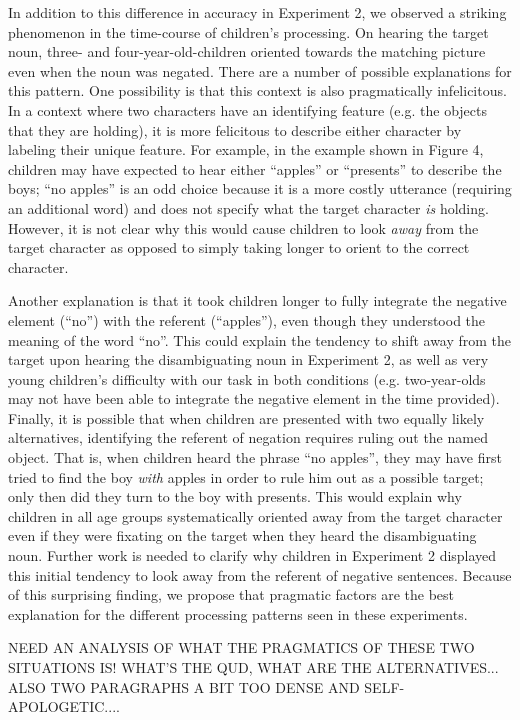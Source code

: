 \documentclass[man]{apa2}
\begin{document}
In addition to this difference in accuracy in Experiment 2, we observed a striking phenomenon in the time-course of children's processing. On hearing the target noun, three- and four-year-old-children oriented towards the matching picture even when the noun was negated.  There are a number of possible explanations for this pattern.  One possibility is that this context is also pragmatically infelicitous.  In a context where two characters have an identifying feature (e.g. the objects that they are holding), it is more felicitous to describe either character by labeling their unique feature.  For example, in the example shown in Figure 4, children may have expected to hear either ``apples'' or ``presents'' to describe the boys; ``no apples'' is an odd choice because it is a more costly utterance (requiring an additional word) and does not specify what the target character \emph{is} holding.  However, it is not clear why this would cause children to look \emph{away} from the target character as opposed to simply taking longer to orient to the correct character.  

Another explanation is that it took children longer to fully integrate the negative element (``no'') with the referent (``apples''), even though they understood the meaning of the word ``no''.  This could explain the tendency to shift away from the target upon hearing the disambiguating noun in Experiment 2, as well as very young children's difficulty with our task in both conditions (e.g. two-year-olds may not have been able to integrate the negative element in the time provided).  Finally, it is possible that when children are presented with two equally likely alternatives, identifying the referent of negation requires ruling out the named object.  That is, when children heard the phrase ``no apples'', they may have first tried to find the boy \emph{with} apples in order to rule him out as a possible target; only then did they turn to the boy with presents.  This would explain why children in all age groups systematically oriented away from the target character even if they were fixating on the target when they heard the disambiguating noun.  Further work is needed to clarify why children in Experiment 2 displayed this initial tendency to look away from the referent of negative sentences.  Because of this surprising finding, we propose that pragmatic factors are the best explanation for the different processing patterns seen in these experiments. 

NEED AN ANALYSIS OF WHAT THE PRAGMATICS OF THESE TWO SITUATIONS IS! WHAT'S THE QUD, WHAT ARE THE ALTERNATIVES... ALSO TWO PARAGRAPHS A BIT TOO DENSE AND SELF-APOLOGETIC....
\end{document}
